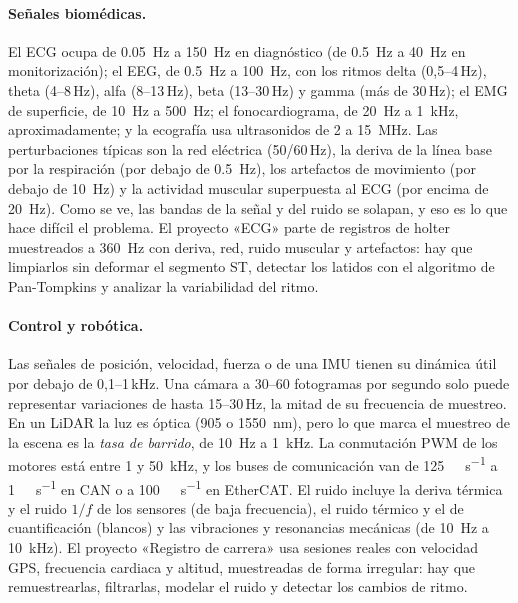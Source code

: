 \documentclass[11pt,a4paper]{scrartcl}
\begin{document}
\paragraph{Señales biomédicas.} El ECG ocupa de \SI{0,05}{\hertz} a \SI{150}{\hertz} en diagnóstico (de \SI{0,5}{\hertz} a \SI{40}{\hertz} en monitorización); el EEG, de \SI{0,5}{\hertz} a \SI{100}{\hertz}, con los ritmos delta (0,5–4\,Hz), theta (4–8\,Hz), alfa (8–13\,Hz), beta (13–30\,Hz) y gamma (más de 30\,Hz); el EMG de superficie, de \SI{10}{\hertz} a \SI{500}{\hertz}; el fonocardiograma, de \SI{20}{\hertz} a \SI{1}{\kilo\hertz}, aproximadamente; y la ecografía usa ultrasonidos de 2 a \SI{15}{\mega\hertz}. Las perturbaciones típicas son la red eléctrica (50/60\,Hz), la deriva de la línea base por la respiración (por debajo de \SI{0,5}{\hertz}), los artefactos de movimiento (por debajo de \SI{10}{\hertz}) y la actividad muscular superpuesta al ECG (por encima de \SI{20}{\hertz}). Como se ve, las bandas de la señal y del ruido se solapan, y eso es lo que hace difícil el problema. El proyecto «ECG» parte de registros de holter muestreados a \SI{360}{\hertz} con deriva, red, ruido muscular y artefactos: hay que limpiarlos sin deformar el segmento ST, detectar los latidos con el algoritmo de Pan-Tompkins y analizar la variabilidad del ritmo.

\paragraph{Control y robótica.} Las señales de posición, velocidad, fuerza o de una IMU tienen su dinámica útil por debajo de 0,1–1\,kHz. Una cámara a 30–60 fotogramas por segundo solo puede representar variaciones de hasta 15–30\,Hz, la mitad de su frecuencia de muestreo. En un LiDAR la luz es óptica (905 o \SI{1550}{\nano\metre}), pero lo que marca el muestreo de la escena es la \emph{tasa de barrido}, de \SI{10}{\hertz} a \SI{1}{\kilo\hertz}. La conmutación PWM de los motores está entre 1 y \SI{50}{\kilo\hertz}, y los buses de comunicación van de \SI{125}{\kilo\bit\per\second} a \SI{1}{\mega\bit\per\second} en CAN o a \SI{100}{\mega\bit\per\second} en EtherCAT. El ruido incluye la deriva térmica y el ruido $1/f$ de los sensores (de baja frecuencia), el ruido térmico y el de cuantificación (blancos) y las vibraciones y resonancias mecánicas (de \SI{10}{\hertz} a \SI{10}{\kilo\hertz}). El proyecto «Registro de carrera» usa sesiones reales con velocidad GPS, frecuencia cardiaca y altitud, muestreadas de forma irregular: hay que remuestrearlas, filtrarlas, modelar el ruido y detectar los cambios de ritmo.
\end{document}
